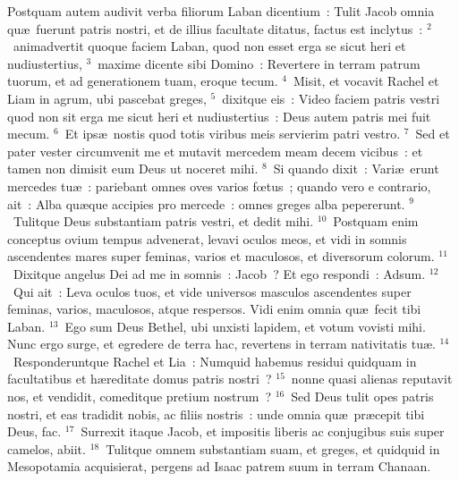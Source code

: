 \lettrine[lines=3,image=true,loversize=0.05,lraise=-0.03]{P}{}ostquam autem audivit verba filiorum Laban dicentium~: Tulit Jacob omnia qu\ae\ fuerunt patris nostri, et de illius facultate ditatus, factus est inclytus~:
${}^{2}$~animadvertit quoque faciem Laban, quod non esset erga se sicut heri et nudiustertius,
${}^{3}$~maxime dicente sibi Domino~: Revertere in terram patrum tuorum, et ad generationem tuam, eroque tecum.
${}^{4}$~Misit, et vocavit Rachel et Liam in agrum, ubi pascebat greges,
${}^{5}$~dixitque eis~: Video faciem patris vestri quod non sit erga me sicut heri et nudiustertius~: Deus autem patris mei fuit mecum.
${}^{6}$~Et ips\ae\ nostis quod totis viribus meis servierim patri vestro.
${}^{7}$~Sed et pater vester circumvenit me et mutavit mercedem meam decem vicibus~: et tamen non dimisit eum Deus ut noceret mihi.
${}^{8}$~Si quando dixit~: Vari\ae\ erunt mercedes tu\ae~: pariebant omnes oves varios fœtus~; quando vero e contrario, ait~: Alba qu\ae que accipies pro mercede~: omnes greges alba pepererunt.
${}^{9}$~Tulitque Deus substantiam patris vestri, et dedit mihi.
${}^{10}$~Postquam enim conceptus ovium tempus advenerat, levavi oculos meos, et vidi in somnis ascendentes mares super feminas, varios et maculosos, et diversorum colorum.
${}^{11}$~Dixitque angelus Dei ad me in somnis~: Jacob~? Et ego respondi~: Adsum.
${}^{12}$~Qui ait~: Leva oculos tuos, et vide universos masculos ascendentes super feminas, varios, maculosos, atque respersos. Vidi enim omnia qu\ae\ fecit tibi Laban.
${}^{13}$~Ego sum Deus Bethel, ubi unxisti lapidem, et votum vovisti mihi. Nunc ergo surge, et egredere de terra hac, revertens in terram nativitatis tu\ae .
${}^{14}$~Responderuntque Rachel et Lia~: Numquid habemus residui quidquam in facultatibus et h\ae reditate domus patris nostri~?
${}^{15}$~nonne quasi alienas reputavit nos, et vendidit, comeditque pretium nostrum~?
${}^{16}$~Sed Deus tulit opes patris nostri, et eas tradidit nobis, ac filiis nostris~: unde omnia qu\ae\ pr\ae cepit tibi Deus, fac.
${}^{17}$~Surrexit itaque Jacob, et impositis liberis ac conjugibus suis super camelos, abiit.
${}^{18}$~Tulitque omnem substantiam suam, et greges, et quidquid in Mesopotamia acquisierat, pergens ad Isaac patrem suum in terram Chanaan.


